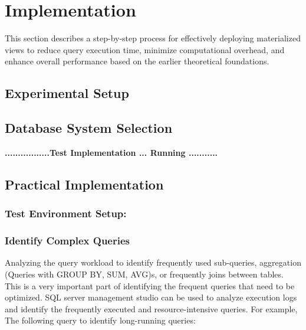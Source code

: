 \section{Implementation}
This section describes a step-by-step process for effectively deploying materialized views to reduce query execution time, minimize computational overhead, and enhance overall performance based on the earlier theoretical foundations. 
\subsection{Experimental Setup}
\subsection{Database System Selection}



 \begin{center}
     \textbf{.................Test Implementation ... Running ...........}
 \end{center}

\subsection{Practical Implementation}
\subsubsection{Test Environment Setup:}
\subsubsection{Identify Complex Queries} Analyzing the query workload to identify frequently used sub-queries, aggregation (Queries with GROUP BY, SUM, AVG)s, or frequently joins between tables. This is a very important part of identifying the frequent queries that need to be optimized. SQL server management studio can be used to analyze execution logs and identify the frequently executed and resource-intensive queries. For example, The following query to identify long-running queries:



